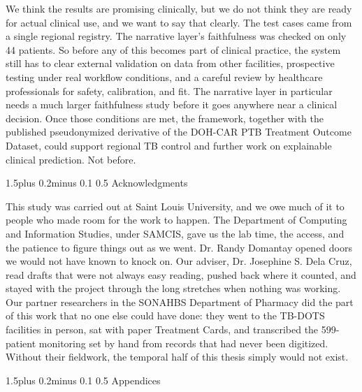 \documentclass[12pt]{article}
\makeatletter
\renewcommand{\_}{\textunderscore\allowbreak}
\renewcommand{\section}{\@startsection{section}{1}{0pt}%
  {1.5\baselineskip plus 0.2\baselineskip minus 0.1\baselineskip}%
  {0.5\baselineskip}%
  {\centering\bfseries\normalsize}}
\makeatother
\begin{document}
We think the results are promising clinically, but we do not think they are ready for actual clinical use, and we want to say that clearly. The test cases came from a single regional registry. The narrative layer's faithfulness was checked on only 44 patients. So before any of this becomes part of clinical practice, the system still has to clear external validation on data from other facilities, prospective testing under real workflow conditions, and a careful review by healthcare professionals for safety, calibration, and fit. The narrative layer in particular needs a much larger faithfulness study before it goes anywhere near a clinical decision. Once those conditions are met, the framework, together with the published pseudonymized derivative of the DOH-CAR PTB Treatment Outcome Dataset, could support regional TB control and further work on explainable clinical prediction. Not before.

\FloatBarrier
\section{Acknowledgments}

This study was carried out at Saint Louis University, and we owe much of it to people who made room for the work to happen. The Department of Computing and Information Studies, under SAMCIS, gave us the lab time, the access, and the patience to figure things out as we went. Dr. Randy Domantay opened doors we would not have known to knock on. Our adviser, Dr. Josephine S. Dela Cruz, read drafts that were not always easy reading, pushed back where it counted, and stayed with the project through the long stretches when nothing was working. Our partner researchers in the SONAHBS Department of Pharmacy did the part of this work that no one else could have done: they went to the TB-DOTS facilities in person, sat with paper Treatment Cards, and transcribed the 599-patient monitoring set by hand from records that had never been digitized. Without their fieldwork, the temporal half of this thesis simply would not exist.

\newpage
\printbibliography[title={References},heading=bibintoc]

\newpage
\appendix

\section{Appendices}
\end{document}
